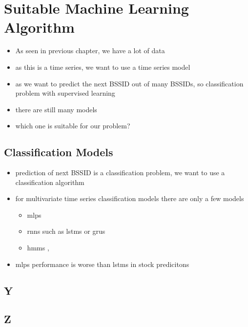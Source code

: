 \chapter{Suitable Machine Learning Algorithm}\label{sec:ml-algo}


\begin{itemize}
    \item As seen in previous chapter, we have a lot of data
    \item as this is a time series, we want to use a time series model
    \item as we want to predict the next BSSID out of many BSSIDs, so classification problem with supervised learning
    \item there are still many models
    \item which one is suitable for our problem?
\end{itemize}

\section{Classification Models}
\begin{itemize}
    \item prediction of next BSSID is a classification problem, we want to use a classification algorithm
    \item for multivariate time series classification models there are only a few models
    \begin{itemize}
        \item \acp{mlp} \cite{TSC}
        \item \acp{rnn} such as \acp{lstm}\cite{lstm-hochreiter} or \acp{gru}
        \item \acp{hmm} \cite{hmm-movement-prediction}, 
    \end{itemize}
    \item \acp{mlp} performance is worse than \acp{lstm} in stock predicitons\cite{comparison-lstm-mlp} 
\end{itemize}



\section{Y}

\section{Z}

